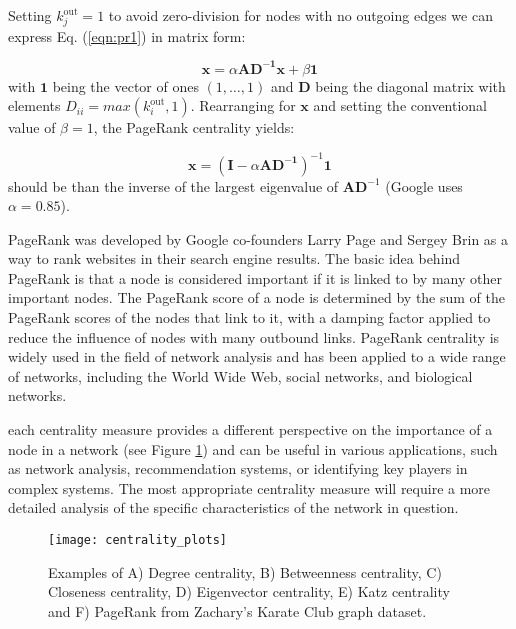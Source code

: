 Setting $k_j^{\text{out}}=1$ to avoid zero-division for nodes with no outgoing edges we can express Eq. (\ref{eqn:pr1}) in matrix form:

\begin{equation}
\label{eqn:pr2}
    \mathbf{x} = \alpha\mathbf{AD^{-1}x} + \beta \mathbf{1}
\end{equation}
with $\mathbf{1}$ being the vector of ones $(1,\dots,1)$ and $\mathbf{D}$ being the diagonal matrix with elements $D_{ii} = max(k_i^{\text{out}},1)$. Rearranging for $\mathbf{x}$ and setting the conventional value of $\beta=1$, the PageRank centrality yields:

\begin{equation}
\label{eqn:pr3}
    \mathbf{x} = (\mathbf{I} - \alpha\mathbf{AD^{-1}})^{-1} \mathbf{1}
\end{equation}
 should be  than the inverse of the largest eigenvalue of $\mathbf{AD}^{-1}$ (Google uses $\alpha = 0.85$).


PageRank was developed by Google co-founders Larry Page and Sergey Brin as a way to rank websites in their search engine results. The basic idea behind PageRank is that a node is considered important if it is linked to by many other important nodes. The PageRank score of a node is determined by the sum of the PageRank scores of the nodes that link to it, with a damping factor applied to reduce the influence of nodes with many outbound links. PageRank centrality is widely used in the field of network analysis and has been applied to a wide range of networks, including the World Wide Web, social networks, and biological networks. 

 each centrality measure provides a different perspective on the importance of a node in a network (see Figure \ref{centrality}) and can be useful in various applications, such as network analysis, recommendation systems, or identifying key players in complex systems. The most appropriate centrality measure will require a more detailed analysis of the specific characteristics of the network in question.

\begin{figure}[h]\centering
	\texttt{[image: centrality\_plots]}
	\caption{Examples of A) Degree centrality, B) Betweenness centrality, C) Closeness centrality, D) Eigenvector centrality, E) Katz centrality and F) PageRank from  Zachary’s Karate Club graph dataset. }
	\label{centrality}
	\bigskip
\end{figure}

